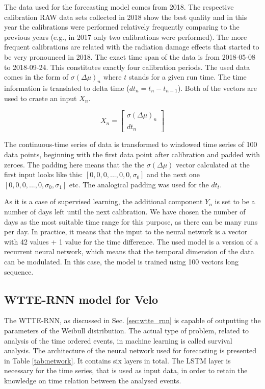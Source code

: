 The data used for the forecasting model comes from 2018. The respective calibration RAW data sets collected in 2018 show the best quality and in this year the calibrations were performed relatively frequently comparing to the previous years (e.g., in 2017 only two calibrations were performed). The more frequent calibrations are related with the radiation damage effects that started to be very pronounced in 2018. The exact time span of the data is from 2018-05-08 to 2018-09-24.
This constitutes exactly four calibration periods. The used data comes in the form of $\sigma(\Delta\mu)_{n}$ where $t$ stands for a given run time.
The time information is translated to delta time ($dt_{n} = t_{n}-t_{n-1}$). 
Both of the vectors are used to craete an input $X_{n}$.

\begin{equation}
X_{n} = \begin{bmatrix} \sigma(\Delta\mu)_{n} \\ dt_{n} \end{bmatrix}
\end{equation}

The continuous-time series of data is transformed to windowed time series of 100 data points, beginning with the first data point after calibration and padded with zeroes.
The padding here means that the the $\sigma(\Delta\mu)$ vector calculated at the first input looks like this: $[0, 0, 0, ..., 0, 0, \sigma_{0}]$ and the next one $[0, 0, 0, ..., 0, \sigma_{0}, \sigma_{1}]$ etc. The analogical padding was used for the $dt_{t}$.

As it is a case of supervised learning, the additional component $Y_{n}$ is set to be a number of days left until the next calibration.
We have chosen the number of days as the most suitable time range for this purpose, as there can be many runs per day.
In practice, it means that the input to the neural network is a vector with 42 values + 1 value for the time difference.
The used model is a version of a recurrent neural network, which means that the temporal dimension of the data can be modulated.
In this case, the model is trained using 100 vectors long sequence.


\subsection{WTTE-RNN model for Velo}

The WTTE-RNN, as discussed in Sec. \ref{sec:wtte_rnn} is capable of outputting the parameters of the Weibull distribution.
The actual type of problem, related to analysis of the time ordered events, in machine learning is called survival analysis. The architecture of the neural network used for forecasting is presented in Table \ref{tab:network}.
It contains six layers in total. The LSTM layer is necessary for the time series, that is used as input data, in order to retain the knowledge on time relation between the analysed events.

